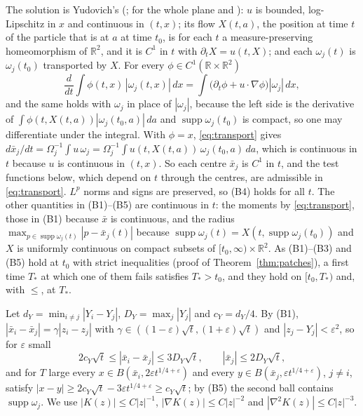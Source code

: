 \documentclass[11pt]{article}
\theoremstyle{definition}
\newcommand{\R}{\mathbb{R}}
\begin{document}
The solution is Yudovich's (\cite{yudovich1963}; for the whole plane \cite[Theorems~1.6 and~3.3]{cs2024} and \cite[Remark~2.4]{akln2015}): $u$ is bounded, log-Lipschitz in $x$ and continuous in $(t, x)$; its flow $X(t, a)$, the position at time $t$ of the particle that is at $a$ at time $t_0$, is for each $t$ a measure-preserving homeomorphism of $\R^2$, and it is $C^1$ in $t$ with $\partial_tX = u(t, X)$; and each $\omega_j(t)$ is $\omega_j(t_0)$ transported by $X$. For every $\phi \in C^1(\R\times\R^2)$
\begin{equation}\label{eq:transport}
  \frac{d}{dt}\int\phi(t, x)\,|\omega_j(t, x)|\,dx = \int\bigl(\partial_t\phi + u\cdot\nabla\phi\bigr)|\omega_j|\,dx,
\end{equation}
and the same holds with $\omega_j$ in place of $|\omega_j|$, because the left side is the derivative of $\int\phi(t, X(t, a))|\omega_j(t_0, a)|\,da$ and $\operatorname{supp}\omega_j(t_0)$ is compact, so one may differentiate under the integral. With $\phi = x$, \eqref{eq:transport} gives $d\bar x_j/dt = \Omega_j^{-1}\int u\,\omega_j = \Omega_j^{-1}\int u(t, X(t, a))\,\omega_j(t_0, a)\,da$, which is continuous in $t$ because $u$ is continuous in $(t, x)$. So each centre $\bar x_j$ is $C^1$ in $t$, and the test functions below, which depend on $t$ through the centres, are admissible in \eqref{eq:transport}. $L^p$ norms and signs are preserved, so (B4) holds for all $t$. The other quantities in (B1)--(B5) are continuous in $t$: the moments by \eqref{eq:transport}, those in (B1) because $\bar x$ is continuous, and the radius $\max_{p \in \operatorname{supp}\omega_j(t)}|p - \bar x_j(t)|$ because $\operatorname{supp}\omega_j(t) = X(t, \operatorname{supp}\omega_j(t_0))$ and $X$ is uniformly continuous on compact subsets of $[t_0, \infty) \times \R^2$. As (B1)--(B3) and (B5) hold at $t_0$ with strict inequalities (proof of Theorem~\ref{thm:patches}), a first time $T_*$ at which one of them fails satisfies $T_* > t_0$, and they hold on $[t_0, T_*)$ and, with $\le$, at $T_*$.

Let $d_Y = \min_{i \ne j}|Y_i - Y_j|$, $D_Y = \max_j|Y_j|$ and $c_Y = d_Y/4$. By (B1), $|\bar x_i - \bar x_j| = \gamma|z_i - z_j|$ with $\gamma \in ((1-\varepsilon)\sqrt t, (1+\varepsilon)\sqrt t)$ and $|z_j - Y_j| < \varepsilon^2$, so for $\varepsilon$ small
\begin{equation}\label{eq:geom}
  2c_Y\sqrt t \le |\bar x_i - \bar x_j| \le 3D_Y\sqrt t,\qquad |\bar x_j| \le 2D_Y\sqrt t,
\end{equation}
and for $T$ large every $x \in B(\bar x_i, 2\varepsilon t^{1/4+\varepsilon})$ and every $y \in B(\bar x_j, \varepsilon t^{1/4+\varepsilon})$, $j \ne i$, satisfy $|x - y| \ge 2c_Y\sqrt t - 3\varepsilon t^{1/4+\varepsilon} \ge c_Y\sqrt t$; by (B5) the second ball contains $\operatorname{supp}\omega_j$. We use $|K(z)| \le C|z|^{-1}$, $|\nabla K(z)| \le C|z|^{-2}$ and $|\nabla^2K(z)| \le C|z|^{-3}$.
\end{document}
